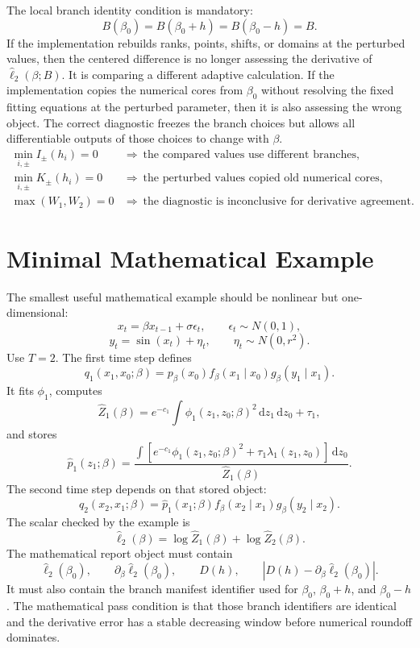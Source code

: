 \documentclass[11pt]{article}
\newcommand{\dd}{\,\mathrm d}
\newcommand{\widehatell}{\widehat\ell}
\begin{document}
The local branch identity condition is mandatory:
\[
    B(\beta_0)=B(\beta_0+h)=B(\beta_0-h)=B.
    \label{eq:p24-p22-fd6}
\]
If the implementation rebuilds ranks, points, shifts, or domains at the
perturbed values, then the centered difference is no longer assessing the
derivative of \(\widehatell_2(\beta;B)\).  It is comparing a different
adaptive calculation.
If the implementation copies the numerical cores from \(\beta_0\) without
resolving the fixed fitting equations at the perturbed parameter, then it is
also assessing the wrong object.  The correct diagnostic freezes the branch choices but
allows all differentiable outputs of those choices to change with \(\beta\).
\[
    \begin{array}{ll}
    \min_{i,\pm}I_\pm(h_i)=0
    &\Rightarrow\ \text{the compared values use different branches},\\[2mm]
    \min_{i,\pm}K_\pm(h_i)=0
    &\Rightarrow\ \text{the perturbed values copied old numerical cores},\\[2mm]
    \max(W_1,W_2)=0
    &\Rightarrow\ \text{the diagnostic is inconclusive for derivative agreement}.
    \end{array}
    \label{eq:p24-p22-fd9}
\]

\section{Minimal Mathematical Example}

The smallest useful mathematical example should be nonlinear but one-dimensional:
\[
    x_t=\beta x_{t-1}+\sigma\epsilon_t,
    \qquad
    \epsilon_t\sim N(0,1),
    \label{eq:p24-p19-102}
\]
\[
    y_t=\sin(x_t)+\eta_t,
    \qquad
    \eta_t\sim N(0,r^2).
    \label{eq:p24-p19-103}
\]
Use \(T=2\).  The first time step defines
\[
    q_1(x_1,x_0;\beta)
    =
    p_\beta(x_0)
    f_\beta(x_1\mid x_0)
    g_\beta(y_1\mid x_1).
    \label{eq:p24-p19-104}
\]
It fits \(\phi_1\), computes
\[
    \widehat Z_1(\beta)=e^{-c_1}\int \phi_1(z_1,z_0;\beta)^2
    \dd z_1\dd z_0+\tau_1,
    \label{eq:p24-p19-105}
\]
and stores
\[
    \widehat p_1(z_1;\beta)
    =
    \frac{\int
    \left[e^{-c_1}\phi_1(z_1,z_0;\beta)^2+\tau_1\lambda_1(z_1,z_0)\right]
    \dd z_0}
    {\widehat Z_1(\beta)}.
    \label{eq:p24-p19-106}
\]
The second time step depends on that stored object:
\[
    q_2(x_2,x_1;\beta)
    =
    \widehat p_1(x_1;\beta)
    f_\beta(x_2\mid x_1)
    g_\beta(y_2\mid x_2).
    \label{eq:p24-p19-107}
\]
The scalar checked by the example is
\[
    \widehatell_2(\beta)
    =
    \log\widehat Z_1(\beta)
    +
    \log\widehat Z_2(\beta).
    \label{eq:p24-p19-108}
\]
The mathematical report object must contain
\[
    \widehatell_2(\beta_0),
    \qquad
    \partial_\beta\widehatell_2(\beta_0),
    \qquad
    D(h),
    \qquad
    |D(h)-\partial_\beta\widehatell_2(\beta_0)|.
    \label{eq:p24-p19-109}
\]
It must also contain the branch manifest identifier used for \(\beta_0\),
\(\beta_0+h\), and \(\beta_0-h\).  The mathematical pass condition is that
those branch identifiers are identical and the derivative error has a stable
decreasing window before numerical roundoff dominates.
\end{document}
